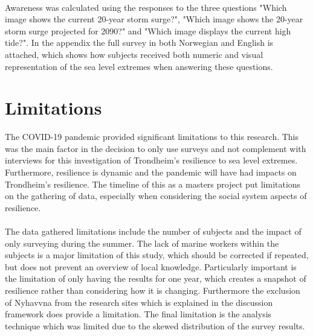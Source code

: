 \paragraph{}
Awareness was calculated using the responses to the three questions "Which image shows the current 20-year storm surge?", "Which image shows the 20-year storm surge projected for 2090?" and "Which image displays the current high tide?". In the appendix the full survey in both Norwegian and English is attached, which shows how subjects received both numeric and visual representation of the sea level extremes when answering these questions. 


\section{Limitations}
The COVID-19 pandemic provided significant limitations to this research. This was the main factor in the decision to only use surveys and not complement with interviews for this investigation of Trondheim's resilience to sea level extremes. Furthermore, resilience is dynamic and the pandemic will have had impacts on Trondheim's resilience. The timeline of this as a masters project put limitations on the gathering of data, especially when considering the social system aspects of resilience. 
\paragraph{}
The data gathered limitations include the number of subjects and the impact of only surveying during the summer. The lack of marine workers within the subjects is a major limitation of this study, which should be corrected if repeated, but does not prevent an overview of local knowledge. Particularly important is the limitation of only having the results for one year, which creates a snapshot of resilience rather than considering how it is changing. Furthermore the exclusion of Nyhavvna from the research sites which is explained in the discussion framework does provide a limitation.  The final limitation is the analysis technique which was limited due to the skewed distribution of the survey results.

